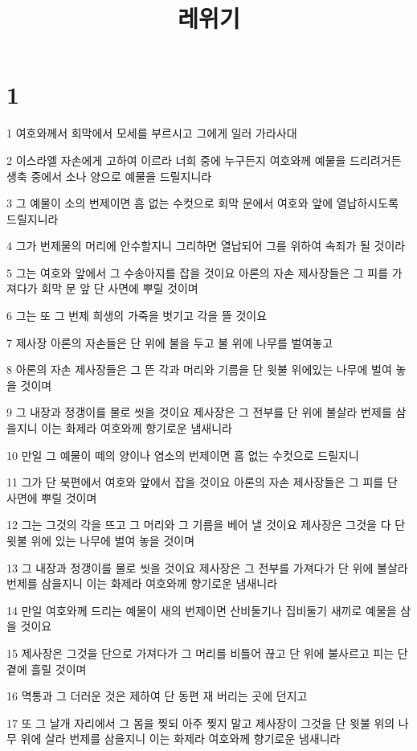 

\title{레위기}


\chapter{1}

\par 1 여호와께서 회막에서 모세를 부르시고 그에게 일러 가라사대
\par 2 이스라엘 자손에게 고하여 이르라 너희 중에 누구든지 여호와께 예물을 드리려거든 생축 중에서 소나 양으로 예물을 드릴지니라
\par 3 그 예물이 소의 번제이면 흠 없는 수컷으로 회막 문에서 여호와 앞에 열납하시도록 드릴지니라
\par 4 그가 번제물의 머리에 안수할지니 그리하면 열납되어 그를 위하여 속죄가 될 것이라
\par 5 그는 여호와 앞에서 그 수송아지를 잡을 것이요 아론의 자손 제사장들은 그 피를 가져다가 회막 문 앞 단 사면에 뿌릴 것이며
\par 6 그는 또 그 번제 희생의 가죽을 벗기고 각을 뜰 것이요
\par 7 제사장 아론의 자손들은 단 위에 불을 두고 불 위에 나무를 벌여놓고
\par 8 아론의 자손 제사장들은 그 뜬 각과 머리와 기름을 단 윗불 위에있는 나무에 벌여 놓을 것이며
\par 9 그 내장과 정갱이를 물로 씻을 것이요 제사장은 그 전부를 단 위에 불살라 번제를 삼을지니 이는 화제라 여호와께 향기로운 냄새니라
\par 10 만일 그 예물이 떼의 양이나 염소의 번제이면 흠 없는 수컷으로 드릴지니
\par 11 그가 단 북편에서 여호와 앞에서 잡을 것이요 아론의 자손 제사장들은 그 피를 단 사면에 뿌릴 것이며
\par 12 그는 그것의 각을 뜨고 그 머리와 그 기름을 베어 낼 것이요 제사장은 그것을 다 단 윗불 위에 있는 나무에 벌여 놓을 것이며
\par 13 그 내장과 정갱이를 물로 씻을 것이요 제사장은 그 전부를 가져다가 단 위에 불살라 번제를 삼을지니 이는 화제라 여호와께 향기로운 냄새니라
\par 14 만일 여호와께 드리는 예물이 새의 번제이면 산비둘기나 집비둘기 새끼로 예물을 삼을 것이요
\par 15 제사장은 그것을 단으로 가져다가 그 머리를 비틀어 끊고 단 위에 불사르고 피는 단 곁에 흘릴 것이며
\par 16 멱통과 그 더러운 것은 제하여 단 동편 재 버리는 곳에 던지고
\par 17 또 그 날개 자리에서 그 몸을 찢되 아주 찢지 말고 제사장이 그것을 단 윗불 위의 나무 위에 살라 번제를 삼을지니 이는 화제라 여호와께 향기로운 냄새니라

